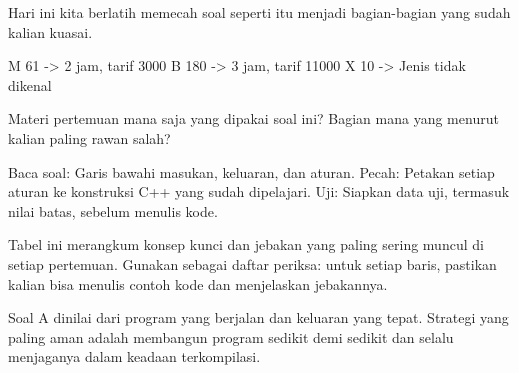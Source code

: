 \documentclass[a4paper]{article}
\begin{document}
Hari ini kita berlatih memecah soal seperti itu menjadi bagian-bagian yang sudah kalian kuasai.

\begin{MKeluaran}[title={Tampilan yang diinginkan}]
M 61   -> 2 jam, tarif 3000
B 180  -> 3 jam, tarif 11000
X 10   -> Jenis tidak dikenal
\end{MKeluaran}
\begin{Tebak}
Materi pertemuan mana saja yang dipakai soal ini? Bagian mana yang menurut kalian paling rawan salah?
\end{Tebak}
\begin{Jawaban}
Baca soal: Garis bawahi masukan, keluaran, dan aturan. Pecah: Petakan setiap aturan ke konstruksi C++ yang sudah dipelajari. Uji: Siapkan data uji, termasuk nilai batas, sebelum menulis kode.
\end{Jawaban}
Tabel ini merangkum konsep kunci dan jebakan yang paling sering muncul di setiap pertemuan. Gunakan sebagai daftar periksa: untuk setiap baris, pastikan kalian bisa menulis contoh kode dan menjelaskan jebakannya.

\par\vspace{4pt}\par\vspace{6pt}
Soal A dinilai dari program yang berjalan dan keluaran yang tepat. Strategi yang paling aman adalah membangun program sedikit demi sedikit dan selalu menjaganya dalam keadaan terkompilasi.
\end{document}
